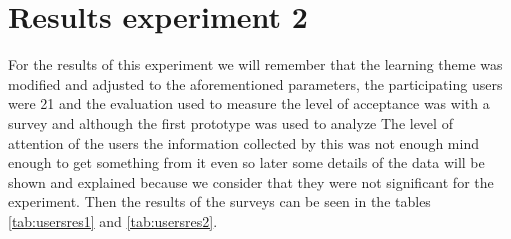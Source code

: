 \section{Results experiment 2}
For the results of this experiment we will remember that the learning theme was modified and adjusted to the aforementioned parameters, the participating users were 21 and the evaluation used to measure the level of acceptance was with a survey and although the first prototype was used to analyze The level of attention of the users the information collected by this was not enough mind enough to get something from it even so later some details of the data will be shown and explained because we consider that they were not significant for the experiment. Then the results of the surveys can be seen in the tables
\ref{tab:usersres1} and \ref{tab:usersres2}.
